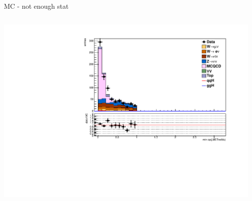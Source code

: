 \documentclass[red,compress,xcolor=table]{beamer}
\begin{document}
\begin{frame}
\begin{columns}
\begin{block}{\scriptsize MC - not enough stat}
\begin{columns}
\hspace*{-0.5cm}
\includegraphics[width=1.2\textwidth]{./qcdinv_qcd_alljetsmetnomu_mindphi.pdf}
\end{columns}


\end{block}
\end{columns}
\end{frame}
\end{document}
